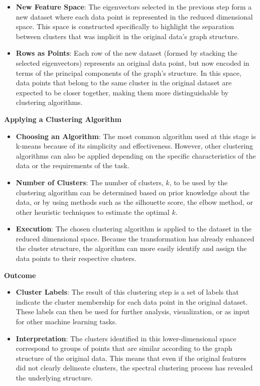 \documentclass[11pt]{article}
\begin{document}
\begin{itemize}
\item
  \textbf{New Feature Space}: The eigenvectors selected in the previous
  step form a new dataset where each data point is represented in the
  reduced dimensional space. This space is constructed specifically to
  highlight the separation between clusters that was implicit in the
  original data's graph structure.
\item
  \textbf{Rows as Points}: Each row of the new dataset (formed by
  stacking the selected eigenvectors) represents an original data point,
  but now encoded in terms of the principal components of the graph's
  structure. In this space, data points that belong to the same cluster
  in the original dataset are expected to be closer together, making
  them more distinguishable by clustering algorithms.
\end{itemize}

    \textbf{Applying a Clustering Algorithm}

\begin{itemize}
\item
  \textbf{Choosing an Algorithm}: The most common algorithm used at this
  stage is k-means because of its simplicity and effectiveness. However,
  other clustering algorithms can also be applied depending on the
  specific characteristics of the data or the requirements of the task.
\item
  \textbf{Number of Clusters}: The number of clusters, \(k\), to be used
  by the clustering algorithm can be determined based on prior knowledge
  about the data, or by using methods such as the silhouette score, the
  elbow method, or other heuristic techniques to estimate the optimal
  \(k\).
\item
  \textbf{Execution}: The chosen clustering algorithm is applied to the
  dataset in the reduced dimensional space. Because the transformation
  has already enhanced the cluster structure, the algorithm can more
  easily identify and assign the data points to their respective
  clusters.
\end{itemize}

    \textbf{Outcome}

\begin{itemize}
\item
  \textbf{Cluster Labels}: The result of this clustering step is a set
  of labels that indicate the cluster membership for each data point in
  the original dataset. These labels can then be used for further
  analysis, visualization, or as input for other machine learning tasks.
\item
  \textbf{Interpretation}: The clusters identified in this
  lower-dimensional space correspond to groups of points that are
  similar according to the graph structure of the original data. This
  means that even if the original features did not clearly delineate
  clusters, the spectral clustering process has revealed the underlying
  structure.
\end{itemize}
\end{document}
